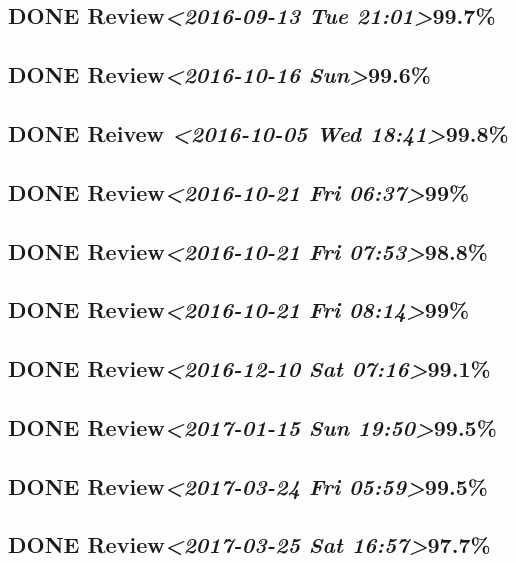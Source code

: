 \documentclass[11pt]{ctexart}
\begin{document}
\subsection{{\bfseries\sffamily DONE} Review\textit{<2016-09-13 Tue 21:01>}99.7\%}
\label{sec:org32efe62}
\subsection{{\bfseries\sffamily DONE} Review\textit{<2016-10-16 Sun>}99.6\%}
\label{sec:orgc497b98}
\subsection{{\bfseries\sffamily DONE} Reivew \textit{<2016-10-05 Wed 18:41>}99.8\%}
\label{sec:orgdbdc722}
\subsection{{\bfseries\sffamily DONE} Review\textit{<2016-10-21 Fri 06:37>}99\%}
\label{sec:org3059362}
\subsection{{\bfseries\sffamily DONE} Review\textit{<2016-10-21 Fri 07:53>}98.8\%}
\label{sec:orgbcdca08}
\subsection{{\bfseries\sffamily DONE} Review\textit{<2016-10-21 Fri 08:14>}99\%}
\label{sec:orgc159604}
\subsection{{\bfseries\sffamily DONE} Review\textit{<2016-12-10 Sat 07:16>}99.1\%}
\label{sec:org27c0bcb}
\subsection{{\bfseries\sffamily DONE} Review\textit{<2017-01-15 Sun 19:50>}99.5\%}
\label{sec:org6be6aba}
\subsection{{\bfseries\sffamily DONE} Review\textit{<2017-03-24 Fri 05:59>}99.5\%}
\label{sec:orge435b21}
\subsection{{\bfseries\sffamily DONE} Review\textit{<2017-03-25 Sat 16:57>}97.7\%}
\label{sec:org4332fc3}
\end{document}
